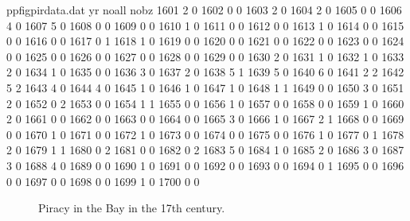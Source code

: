 \begin{filecontents}{ppfigpirdata.dat}
yr	noall	nobz
1601	2	0
1602	0	0
1603	2	0
1604	2	0
1605	0	0
1606	4	0
1607	5	0
1608	0	0
1609	0	0
1610	1	0
1611	0	0
1612	0	0
1613	1	0
1614	0	0
1615	0	0
1616	0	0
1617	0	1
1618	1	0
1619	0	0
1620	0	0
1621	0	0
1622	0	0
1623	0	0
1624	0	0
1625	0	0
1626	0	0
1627	0	0
1628	0	0
1629	0	0
1630	2	0
1631	1	0
1632	1	0
1633	2	0
1634	1	0
1635	0	0
1636	3	0
1637	2	0
1638	5	1
1639	5	0
1640	6	0
1641	2	2
1642	5	2
1643	4	0
1644	4	0
1645	1	0
1646	1	0
1647	1	0
1648	1	1
1649	0	0
1650	3	0
1651	2	0
1652	0	2
1653	0	0
1654	1	1
1655	0	0
1656	1	0
1657	0	0
1658	0	0
1659	1	0
1660	2	0
1661	0	0
1662	0	0
1663	0	0
1664	0	0
1665	3	0
1666	1	0
1667	2	1
1668	0	0
1669	0	0
1670	1	0
1671	0	0
1672	1	0
1673	0	0
1674	0	0
1675	0	0
1676	1	0
1677	0	1
1678	2	0
1679	1	1
1680	0	2
1681	0	0
1682	0	2
1683	5	0
1684	1	0
1685	2	0
1686	3	0
1687	3	0
1688	4	0
1689	0	0
1690	1	0
1691	0	0
1692	0	0
1693	0	0
1694	0	1
1695	0	0
1696	0	0
1697	0	0
1698	0	0
1699	1	0
1700	0	0
\end{filecontents}
\begin{figure}
\begin{sideways}
\end{sideways}
\caption{Piracy in the Bay in the 17th century.}
\label{fig:piracyinbay}
\end{figure}
%
